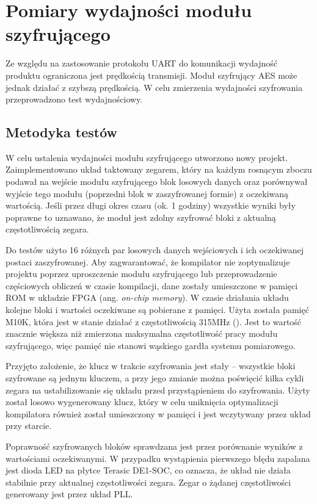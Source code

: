 \section{Pomiary wydajności modułu szyfrującego}
Ze względu na zastosowanie protokołu UART do komunikacji wydajność produktu ograniczona jest prędkością transmisji. Moduł szyfrujący AES może jednak działać z szybszą prędkością. W celu zmierzenia wydajności szyfrowania przeprowadzono test wydajnościowy.

\subsection{Metodyka testów}
W celu ustalenia wydajności modułu szyfrującego utworzono nowy projekt. Zaimplementowano układ taktowany zegarem, który na każdym rosnącym zboczu podawał na wejście modułu szyfrującego blok losowych danych oraz porównywał wyjście tego modułu (poprzedni blok w zaszyfrowanej formie) z oczekiwaną wartością. Jeśli przez długi okres czasu (ok. 1 godziny) wszystkie wyniki były poprawne to uznawano, że moduł jest zdolny szyfrować bloki z aktualną częstotliwością zegara.

Do testów użyto 16 różnych par losowych danych wejściowych i ich oczekiwanej postaci zaszyfrowanej. Aby zagwarantować, że kompilator nie zoptymalizuje projektu poprzez uproszczenie modułu szyfrującego lub przeprowadzenie częściowych obliczeń w czasie kompilacji, dane zostały umieszczone w pamięci ROM w układzie FPGA (ang. \textit{on-chip memory}). W czasie działania układu kolejne bloki i wartości oczekiwane są pobierane z pamięci. Użyta została pamięć M10K, która jest w stanie działać z częstotliwością 315MHz (\cite[rozdz. 2]{altera-vol1}). Jest to wartość znacznie większa niż zmierzona maksymalna częstotliwość pracy modułu szyfrującego, więc pamięć nie stanowi wąskiego gardła systemu pomiarowego.

Przyjęto założenie, że klucz w trakcie szyfrowania jest stały -- wszystkie bloki szyfrowane są jednym kluczem, a przy jego zmianie można poświęcić kilka cykli zegara na ustabilizowanie się układu przed przystąpieniem do szyfrowania. Użyty został losowo wygenerowany klucz, który w celu uniknięcia optymalizacji kompilatora również został umieszczony w pamięci i jest wczytywany przez układ przy starcie.

Poprawność szyfrowanych bloków sprawdzana jest przez porównanie wyników z wartościami oczekiwanymi. W przypadku wystąpienia pierwszego błędu zapalana jest dioda LED na płytce Terasic DE1-SOC, co oznacza, że układ nie działa stabilnie przy aktualnej częstotliwości zegara. Zegar o żądanej częstotliwości generowany jest przez układ PLL.


